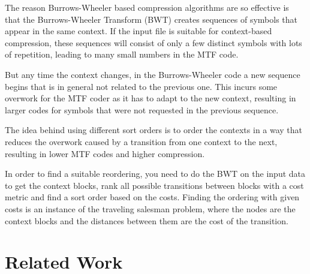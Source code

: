 \documentclass[a4paper]{scrreprt}
\begin{document}

The reason Burrows-Wheeler based compression algorithms are so effective is that
the Burrows-Wheeler Transform (BWT) creates sequences of symbols that appear in
the same context. If the input file is suitable for context-based
compression, these sequences will consist of only a few distinct symbols with
lots of repetition, leading to many small numbers in the MTF code.


But any time the context changes, in the Burrows-Wheeler code a new sequence
begins that is in general not related to the previous one. This incurs some
overwork\cite{bitner1979heuristics} for the MTF coder as it has to adapt to the
new context, resulting in larger codes for symbols that were not requested in
the previous sequence.


The idea behind using different sort orders is to order the contexts in a way
that reduces the overwork caused by a transition from one context to the next,
resulting in lower MTF codes and higher compression.

In order to find a suitable reordering, you need to do the BWT on the input data
to get the context blocks, rank all possible transitions between blocks with a
cost metric and find a sort order based on the costs. Finding the ordering with
given costs is an instance of the traveling salesman problem, where the nodes
are the context blocks and the distances between them are the cost of the
transition.

\section{Related Work}
\end{document}
